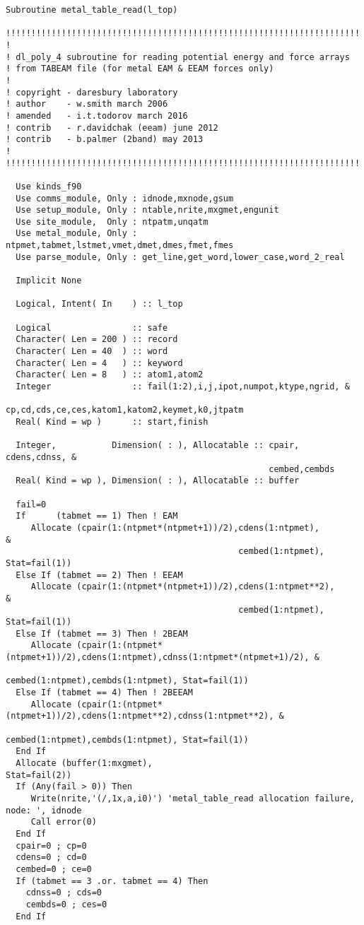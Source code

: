 \begin{lstlisting}[style=sFortran,caption={Add two numbers function}]
Subroutine metal_table_read(l_top)

!!!!!!!!!!!!!!!!!!!!!!!!!!!!!!!!!!!!!!!!!!!!!!!!!!!!!!!!!!!!!!!!!!!!!!!!
!
! dl_poly_4 subroutine for reading potential energy and force arrays
! from TABEAM file (for metal EAM & EEAM forces only)
!
! copyright - daresbury laboratory
! author    - w.smith march 2006
! amended   - i.t.todorov march 2016
! contrib   - r.davidchak (eeam) june 2012
! contrib   - b.palmer (2band) may 2013
!
!!!!!!!!!!!!!!!!!!!!!!!!!!!!!!!!!!!!!!!!!!!!!!!!!!!!!!!!!!!!!!!!!!!!!!!!

  Use kinds_f90
  Use comms_module, Only : idnode,mxnode,gsum
  Use setup_module, Only : ntable,nrite,mxgmet,engunit
  Use site_module,  Only : ntpatm,unqatm
  Use metal_module, Only : ntpmet,tabmet,lstmet,vmet,dmet,dmes,fmet,fmes
  Use parse_module, Only : get_line,get_word,lower_case,word_2_real

  Implicit None

  Logical, Intent( In    ) :: l_top

  Logical                :: safe
  Character( Len = 200 ) :: record
  Character( Len = 40  ) :: word
  Character( Len = 4   ) :: keyword
  Character( Len = 8   ) :: atom1,atom2
  Integer                :: fail(1:2),i,j,ipot,numpot,ktype,ngrid, &
                            cp,cd,cds,ce,ces,katom1,katom2,keymet,k0,jtpatm
  Real( Kind = wp )      :: start,finish

  Integer,           Dimension( : ), Allocatable :: cpair, cdens,cdnss, &
                                                    cembed,cembds
  Real( Kind = wp ), Dimension( : ), Allocatable :: buffer

  fail=0
  If      (tabmet == 1) Then ! EAM
     Allocate (cpair(1:(ntpmet*(ntpmet+1))/2),cdens(1:ntpmet),                              &
                                              cembed(1:ntpmet),                  Stat=fail(1))
  Else If (tabmet == 2) Then ! EEAM
     Allocate (cpair(1:(ntpmet*(ntpmet+1))/2),cdens(1:ntpmet**2),                           &
                                              cembed(1:ntpmet),                  Stat=fail(1))
  Else If (tabmet == 3) Then ! 2BEAM
     Allocate (cpair(1:(ntpmet*(ntpmet+1))/2),cdens(1:ntpmet),cdnss(1:ntpmet*(ntpmet+1)/2), &
                                              cembed(1:ntpmet),cembds(1:ntpmet), Stat=fail(1))
  Else If (tabmet == 4) Then ! 2BEEAM
     Allocate (cpair(1:(ntpmet*(ntpmet+1))/2),cdens(1:ntpmet**2),cdnss(1:ntpmet**2), &
                                              cembed(1:ntpmet),cembds(1:ntpmet), Stat=fail(1))
  End If
  Allocate (buffer(1:mxgmet),                                                    Stat=fail(2))
  If (Any(fail > 0)) Then
     Write(nrite,'(/,1x,a,i0)') 'metal_table_read allocation failure, node: ', idnode
     Call error(0)
  End If
  cpair=0 ; cp=0
  cdens=0 ; cd=0
  cembed=0 ; ce=0
  If (tabmet == 3 .or. tabmet == 4) Then
    cdnss=0 ; cds=0
    cembds=0 ; ces=0
  End If


\end{lstlisting}
